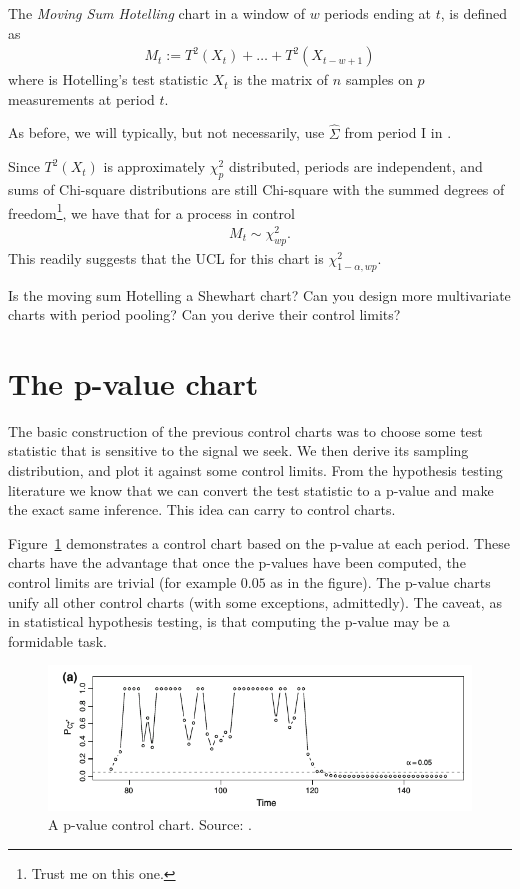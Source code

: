 \begin{definition}
The \emph{Moving Sum Hotelling} chart in a window of $w$ periods ending at $t$, is defined as
\begin{align}
	M_t:= T^2(X_t)+\dots+T^2(X_{t-w+1})
\end{align}
where \tsq is Hotelling's test statistic $X_t$ is the matrix of $n$ samples on $p$ measurements at period $t$. 
\end{definition}
As before, we will typically, but not necessarily, use $\hat{\Sigma}$ from period I in \tsq. 

Since $T^2(X_t)$ is approximately $\chi^2_p$ distributed, periods are independent, and sums of Chi-square distributions are still Chi-square with the summed degrees of freedom\footnote{Trust me on this one.}, we have that for a process in control
\begin{align}
	M_t \sim \chi^2_{wp}.
\end{align}
This readily suggests that the UCL for this chart is $\chi^2_{1-\alpha,wp}$. 

\begin{think}
Is the moving sum Hotelling a Shewhart chart? 
Can you design more multivariate charts with period pooling? 
Can you derive their control limits?
\end{think}





\section{The p-value chart}
The basic construction of the previous control charts was to choose some test statistic that is sensitive to the signal  we seek. We then derive its sampling distribution, and plot it against some control limits. 
From the hypothesis testing literature we know that we can convert the test statistic to a p-value and make the exact same inference. 
This idea can carry to control charts.

Figure~\ref{fig:p-value-chart} demonstrates a control chart based on the p-value at each period.
These charts have the advantage that once the p-values have been computed, the control limits are trivial (for example $0.05$ as in the figure).
The p-value charts unify all other control charts (with some exceptions, admittedly). 
The caveat, as in statistical hypothesis testing, is that computing the p-value may be a formidable task. 

\begin{figure}[t]
\centering
\includegraphics[width=0.7\linewidth]{art/p-value-chart}
\caption{\footnotesize
A p-value control chart. Source: \cite{li_using_2012}.}
\label{fig:p-value-chart}
\end{figure}





